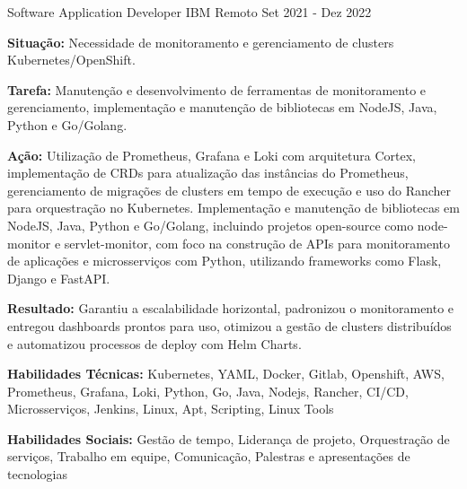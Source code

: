 \begin{cventries}
    \vspace{2mm} %

    \cventry
    {Software Application Developer} %
    {IBM} %
    {Remoto} %
    {Set 2021 - Dez 2022} %
    {
    \begin{cvitems} %
        \item {\textbf{Situação:} Necessidade de monitoramento e gerenciamento de clusters Kubernetes/OpenShift.}        
        \item {\textbf{Tarefa:} Manutenção e desenvolvimento de ferramentas de monitoramento e gerenciamento, implementação e manutenção de bibliotecas em NodeJS, Java, Python e Go/Golang.}   
        \item {\textbf{Ação:} Utilização de Prometheus, Grafana e Loki com arquitetura Cortex, implementação de CRDs para atualização das instâncias do Prometheus, gerenciamento de migrações de clusters em tempo de execução e uso do Rancher para orquestração no Kubernetes. Implementação e manutenção de bibliotecas em NodeJS, Java, Python e Go/Golang, incluindo projetos open-source como node-monitor e servlet-monitor, com foco na construção de APIs para monitoramento de aplicações e microsserviços com Python, utilizando frameworks como Flask, Django e FastAPI.}
        \item {\textbf{Resultado:} Garantiu a escalabilidade horizontal, padronizou o monitoramento e entregou dashboards prontos para uso, otimizou a gestão de clusters distribuídos e automatizou processos de deploy com Helm Charts. }
        \item {\textbf{Habilidades Técnicas:} Kubernetes, YAML, Docker, Gitlab, Openshift, AWS, Prometheus, Grafana, Loki, Python, Go, Java, Nodejs, Rancher, CI/CD, Microsserviços, Jenkins, Linux, Apt, Scripting, Linux Tools}
        \item {\textbf{Habilidades Sociais:} Gestão de tempo, Liderança de projeto, Orquestração de serviços, Trabalho em equipe, Comunicação, Palestras e apresentações de tecnologias}
    \end{cvitems}      
    }    

    \vspace{2mm} %
    

\end{cventries}
